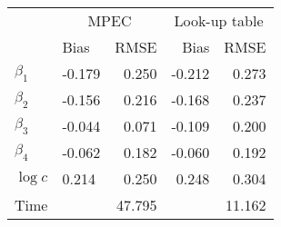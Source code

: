 
\begin{tabular}[t]{llrrr}
\toprule
\multicolumn{1}{c}{ } & \multicolumn{2}{c}{MPEC} & \multicolumn{2}{c}{Look-up table} \\
\cmidrule(l{3pt}r{3pt}){2-3} \cmidrule(l{3pt}r{3pt}){4-5}
  & Bias & RMSE & Bias & RMSE\\
\midrule
$\beta_{1}$ & -0.179 & 0.250 & -0.212 & 0.273\\
$\beta_{2}$ & -0.156 & 0.216 & -0.168 & 0.237\\
$\beta_{3}$ & -0.044 & 0.071 & -0.109 & 0.200\\
$\beta_{4}$ & -0.062 & 0.182 & -0.060 & 0.192\\
$\log c$ & 0.214 & 0.250 & 0.248 & 0.304\\
Time &  & 47.795 &  & 11.162\\
\bottomrule
\end{tabular}
